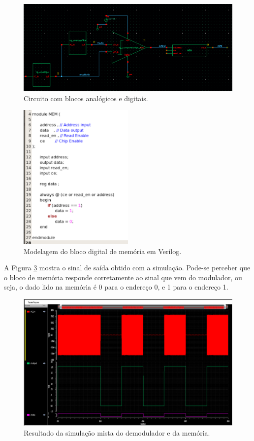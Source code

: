 \begin{figure}[ht!]
  \centering
  \includegraphics[width=\textwidth]{figuras/circ.PNG}
  \caption{Circuito com blocos analógicos e digitais.}
  \label{circ}
\end{figure}

\begin{figure}[ht!]
  \centering
  \includegraphics[width=0.5\textwidth]{figuras/mem.PNG}
  \caption{Modelagem do bloco digital de memória em Verilog.}
  \label{memveri}
\end{figure}

A Figura \ref{simdem} mostra o sinal de saída obtido com a simulação. Pode-se perceber que o bloco de memória responde corretamente ao sinal que vem do modulador, ou seja, o dado lido na memória é 0 para o endereço 0, e 1 para o endereço 1.

\begin{figure}[ht!]
  \centering
  \includegraphics[width=\textwidth]{figuras/simdem.PNG}
  \caption{Resultado da simulação mista do demodulador e da memória.}
  \label{simdem}
\end{figure}


